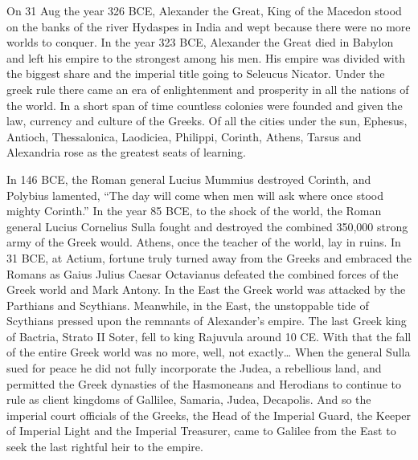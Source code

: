 On 31 Aug the year 326 BCE, Alexander the Great, King of the Macedon stood on the banks of the river Hydaspes in India and wept because there were no more worlds to conquer.
In the year 323 BCE, Alexander the Great died in Babylon and left his empire to the strongest among his men.
His empire was divided with the biggest share and the imperial title going to Seleucus Nicator.
Under the greek rule there came an era of enlightenment and prosperity in all the nations of the world.
In a short span of time countless colonies were founded and given the law, currency and culture of the Greeks.
Of all the cities under the sun, Ephesus, Antioch, Thessalonica, Laodiciea, Philippi, Corinth, Athens, Tarsus and Alexandria rose as the greatest seats of learning.

In 146 BCE, the Roman general Lucius Mummius destroyed Corinth, and Polybius lamented, ``The day will come when men will ask where once stood mighty Corinth.'' In the year 85 BCE, to the shock of the world, the Roman general Lucius Cornelius Sulla fought and destroyed the combined 350,000 strong army of the Greek would.
Athens, once the teacher of the world, lay in ruins.
In 31 BCE, at Actium, fortune truly turned away from the Greeks and embraced the Romans as Gaius Julius Caesar Octavianus defeated the combined forces of the Greek world and Mark Antony.
In the East the Greek world was attacked by the Parthians and Scythians.
Meanwhile, in the East, the unstoppable tide of Scythians pressed upon the remnants of Alexander's empire.
The last Greek king of Bactria, Strato II Soter, fell to king Rajuvula around 10 CE.
With that the fall of the entire Greek world was no more, well, not exactly\ldots{} When the general Sulla sued for peace he did not fully incorporate the Judea, a rebellious land, and permitted the Greek dynasties of the Hasmoneans and Herodians to continue to rule as client kingdoms of Gallilee, Samaria, Judea, Decapolis.
And so the imperial court officials of the Greeks, the Head of the Imperial Guard, the Keeper of Imperial Light and the Imperial Treasurer, came to Galilee from the East to seek the last rightful heir to the empire.

